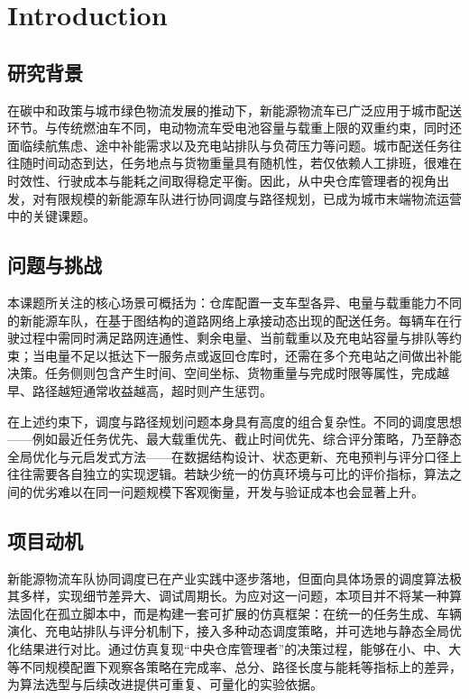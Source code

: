 \chapter{Introduction}

\section{研究背景}

在碳中和政策与城市绿色物流发展的推动下，新能源物流车已广泛应用于城市配送环节。与传统燃油车不同，电动物流车受电池容量与载重上限的双重约束，同时还面临续航焦虑、途中补能需求以及充电站排队与负荷压力等问题。城市配送任务往往随时间动态到达，任务地点与货物重量具有随机性，若仅依赖人工排班，很难在时效性、行驶成本与能耗之间取得稳定平衡。因此，从中央仓库管理者的视角出发，对有限规模的新能源车队进行协同调度与路径规划，已成为城市末端物流运营中的关键课题。

\section{问题与挑战}

本课题所关注的核心场景可概括为：仓库配置一支车型各异、电量与载重能力不同的新能源车队，在基于图结构的道路网络上承接动态出现的配送任务。每辆车在行驶过程中需同时满足路网连通性、剩余电量、当前载重以及充电站容量与排队等约束；当电量不足以抵达下一服务点或返回仓库时，还需在多个充电站之间做出补能决策。任务侧则包含产生时间、空间坐标、货物重量与完成时限等属性，完成越早、路径越短通常收益越高，超时则产生惩罚。

在上述约束下，调度与路径规划问题本身具有高度的组合复杂性。不同的调度思想——例如最近任务优先、最大载重优先、截止时间优先、综合评分策略，乃至静态全局优化与元启发式方法——在数据结构设计、状态更新、充电预判与评分口径上往往需要各自独立的实现逻辑。若缺少统一的仿真环境与可比的评价指标，算法之间的优劣难以在同一问题规模下客观衡量，开发与验证成本也会显著上升。

\section{项目动机}

新能源物流车队协同调度已在产业实践中逐步落地，但面向具体场景的调度算法极其多样，实现细节差异大、调试周期长。为应对这一问题，本项目并不将某一种算法固化在孤立脚本中，而是构建一套可扩展的仿真框架：在统一的任务生成、车辆演化、充电站排队与评分机制下，接入多种动态调度策略，并可选地与静态全局优化结果进行对比。通过仿真复现“中央仓库管理者”的决策过程，能够在小、中、大等不同规模配置下观察各策略在完成率、总分、路径长度与能耗等指标上的差异，为算法选型与后续改进提供可重复、可量化的实验依据。

